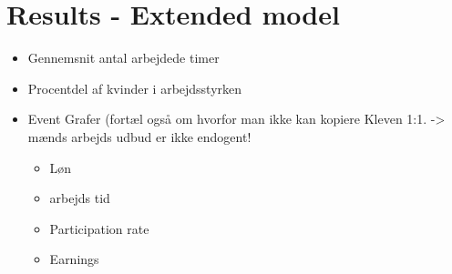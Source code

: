 \section{Results - Extended model}


\begin{itemize}
    \item Gennemsnit antal arbejdede timer
    \item Procentdel af kvinder i arbejdsstyrken
    \item Event Grafer (fortæl også om hvorfor man ikke kan kopiere Kleven 1:1. -> mænds arbejds udbud er ikke endogent!
    \begin{itemize}
        \item Løn
        \item arbejds tid
        \item Participation rate
        \item Earnings
    \end{itemize}
\end{itemize}